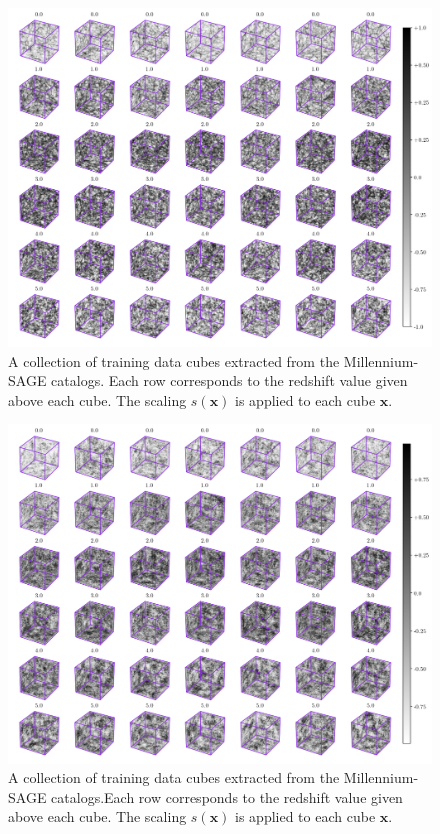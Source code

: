 \documentclass[twocolumn]{article}
\numberwithin{equation}{section}
\begin{document}
\begin{figure}[hbt!]
\includegraphics[width=17cm]{figures/cubes/acgan3d_t_fig.png}
\centering
\caption{A collection of training data cubes extracted from the Millennium-SAGE catalogs. Each row corresponds to the 
         redshift value given above each cube. The scaling $s(\mathbf{x})$ is applied to each cube $\mathbf{x}$.}
\label{fig:t_z_imgs}
\end{figure}

\begin{figure}[hbt!]
\includegraphics[width=17cm]{figures/cubes/acgan3d_g_fig.png}
\centering
\caption{A collection of training data cubes extracted from the Millennium-SAGE catalogs.Each row corresponds to the 
         redshift value given above each cube. The scaling $s(\mathbf{x})$ is applied to each cube $\mathbf{x}$.}
\label{fig:g_z_imgs}
\end{figure}
\end{document}
